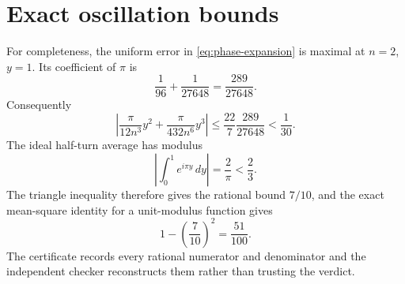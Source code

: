 \section{Exact oscillation bounds}\label{app:bounds}

For completeness, the uniform error in \eqref{eq:phase-expansion} is
maximal at \(n=2\), \(y=1\).  Its coefficient of \(\pi\) is
\[
  \frac1{96}+\frac1{27648}=\frac{289}{27648}.
\]
Consequently
\[
  \left|\frac{\pi}{12n^3}y^2+
  \frac{\pi}{432n^6}y^3\right|
  \le \frac{22}{7}\frac{289}{27648}<\frac1{30}.
\]
The ideal half-turn average has modulus
\[
  \left|\int_0^1e^{i\pi y}\,dy\right|=\frac2\pi<\frac23.
\]
The triangle inequality therefore gives the rational bound \(7/10\), and
the exact mean-square identity for a unit-modulus function gives
\[
  1-\left(\frac7{10}\right)^2=\frac{51}{100}.
\]
The certificate records every rational numerator and denominator and the
independent checker reconstructs them rather than trusting the verdict.
